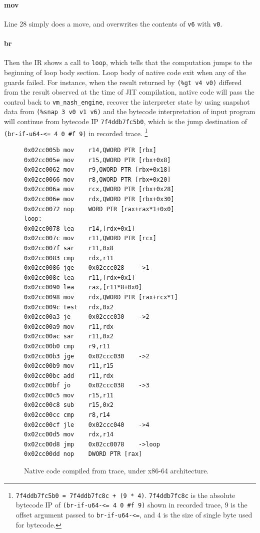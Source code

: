 \documentclass[preprint, 10pt]{sigplanconf}
\begin{document}
\paragraph{mov} Line 28 simply does a move, and overwrites the contents of
\texttt{v6} with \texttt{v0}.

\paragraph{br} Then the IR shows a call to \texttt{loop}, which tells that the
computation jumps to the beginning of loop body section. Loop body of native
code exit when any of the guards failed.  For instance, when the result
returned by \texttt{(\%gt~v4~v0)} differed from the result observed at the
time of JIT compilation, native code will pass the control back to
\texttt{vm\_nash\_engine}, recover the interpreter state by using snapshot
data from \texttt{(\%snap~3~v0~v1~v6)} and the bytecode interpretation of
input program will continue from bytecode IP \texttt{7f4ddb7fc5b0}, which is
the jump destination of \texttt{(br-if-u64-<=~4~0~\#f~9)} in recorded trace.
\footnote{ \texttt{7f4ddb7fc5b0 = 7f4ddb7fc8c + (9 * 4)}.  \texttt{7f4ddb7fc8c}
  is the absolute bytecode IP of \texttt{(br-if-u64-<= 4 0 \#f 9)} shown in
  recorded trace, $9$ is the offset argument passed to \texttt{br-if-u64-<=},
  and $4$ is the size of single byte used for bytecode.}

\begin{figure}
  \centering
  \small
\begin{verbatim}
0x02cc005b mov    r14,QWORD PTR [rbx]
0x02cc005e mov    r15,QWORD PTR [rbx+0x8]
0x02cc0062 mov    r9,QWORD PTR [rbx+0x18]
0x02cc0066 mov    r8,QWORD PTR [rbx+0x20]
0x02cc006a mov    rcx,QWORD PTR [rbx+0x28]
0x02cc006e mov    rdx,QWORD PTR [rbx+0x30]
0x02cc0072 nop    WORD PTR [rax+rax*1+0x0]
loop:
0x02cc0078 lea    r14,[rdx+0x1]
0x02cc007c mov    r11,QWORD PTR [rcx]
0x02cc007f sar    r11,0x8
0x02cc0083 cmp    rdx,r11
0x02cc0086 jge    0x02ccc028    ->1
0x02cc008c lea    r11,[rdx+0x1]
0x02cc0090 lea    rax,[r11*8+0x0]
0x02cc0098 mov    rdx,QWORD PTR [rax+rcx*1]
0x02cc009c test   rdx,0x2
0x02cc00a3 je     0x02ccc030    ->2
0x02cc00a9 mov    r11,rdx
0x02cc00ac sar    r11,0x2
0x02cc00b0 cmp    r9,r11
0x02cc00b3 jge    0x02ccc030    ->2
0x02cc00b9 mov    r11,r15
0x02cc00bc add    r11,rdx
0x02cc00bf jo     0x02ccc038    ->3
0x02cc00c5 mov    r15,r11
0x02cc00c8 sub    r15,0x2
0x02cc00cc cmp    r8,r14
0x02cc00cf jle    0x02ccc040    ->4
0x02cc00d5 mov    rdx,r14
0x02cc00d8 jmp    0x02cc0078    ->loop
0x02cc00dd nop    DWORD PTR [rax]
\end{verbatim}
\caption{Native code compiled from trace, under x86-64 architecture.}
\label{fig:ncode}
\end{figure}
\end{document}
